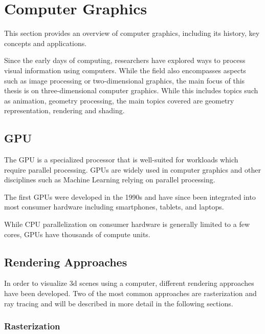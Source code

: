 
\section{Computer Graphics}

This section provides an overview of computer graphics, including its history, key concepts and applications.

Since the early days of computing, researchers have explored ways to process visual information using computers. While the field also encompasses aspects such as image processing or two-dimensional graphics, the main focus of this thesis is on three-dimensional computer graphics. While this includes topics such as animation, geometry processing, the main topics covered are geometry representation, rendering and shading.

\subsection{GPU}

The GPU is a specialized processor that is well-suited for workloads which require parallel processing. GPUs are widely used in computer graphics and other disciplines such as Machine Learning relying on parallel processing.

The first GPUs were developed in the 1990s and have since been integrated into most consumer hardware including smartphones, tablets, and laptops.

While CPU parallelization on consumer hardware is generally limited to a few cores, GPUs have thousands of compute units.

\subsection{Rendering Approaches}

In order to visualize 3d scenes using a computer, different rendering approaches have been developed. Two of the most common approaches are rasterization and ray tracing and will be described in more detail in the following sections.

\subsubsection{Rasterization}

